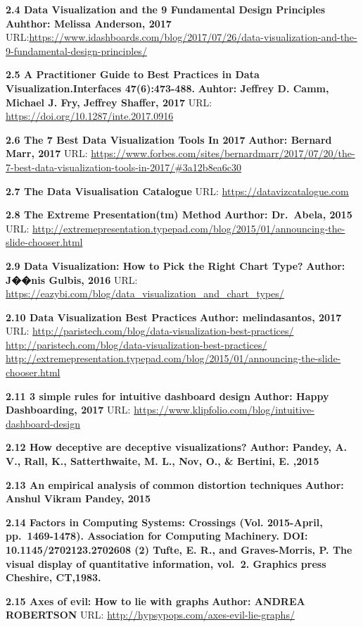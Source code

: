 \documentclass[]{book}
\theoremstyle{definition}
\theoremstyle{definition}
\theoremstyle{definition}
\theoremstyle{remark}
\begin{document}
\textbf{2.4 Data Visualization and the 9 Fundamental Design Principles}
\textbf{Auhthor: Melissa Anderson, 2017}
URL:\url{https://www.idashboards.com/blog/2017/07/26/data-visualization-and-the-9-fundamental-design-principles/}

\textbf{2.5 A Practitioner Guide to Best Practices in Data
Visualization.Interfaces 47(6):473-488.} \textbf{Auhtor: Jeffrey D.
Camm, Michael J. Fry, Jeffrey Shaffer, 2017 } URL:
\url{https://doi.org/10.1287/inte.2017.0916}

\textbf{2.6 The 7 Best Data Visualization Tools In 2017} \textbf{Author:
Bernard Marr, 2017} URL:
\url{https://www.forbes.com/sites/bernardmarr/2017/07/20/the-7-best-data-visualization-tools-in-2017/\#3a12b8ea6c30}

\textbf{2.7 The Data Visualisation Catalogue} URL:
\url{https://datavizcatalogue.com}

\textbf{2.8 The Extreme Presentation(tm) Method } \textbf{Aurthor:
Dr.~Abela, 2015 } URL:
\url{http://extremepresentation.typepad.com/blog/2015/01/announcing-the-slide-chooser.html}

\textbf{2.9 Data Visualization: How to Pick the Right Chart Type? }
\textbf{Author: J��nis Gulbis, 2016 } URL:
\url{https://eazybi.com/blog/data_visualization_and_chart_types/}

\textbf{2.10 Data Visualization Best Practices} \textbf{Author:
melindasantos, 2017} URL:
\url{http://paristech.com/blog/data-visualization-best-practices/}
\url{http://paristech.com/blog/data-visualization-best-practices/}
\url{http://extremepresentation.typepad.com/blog/2015/01/announcing-the-slide-chooser.html}

\textbf{2.11 3 simple rules for intuitive dashboard design}
\textbf{Author: Happy Dashboarding, 2017 } URL:
\url{https://www.klipfolio.com/blog/intuitive-dashboard-design}

\textbf{2.12 How deceptive are deceptive visualizations?}
\textbf{Author: Pandey, A. V., Rall, K., Satterthwaite, M. L., Nov, O.,
\& Bertini, E. ,2015 }

\textbf{2.13 An empirical analysis of common distortion techniques}
\textbf{Author: Anshul Vikram Pandey, 2015 }

\textbf{2.14 Factors in Computing Systems: Crossings (Vol. 2015-April,
pp.~1469-1478). Association for Computing Machinery. DOI:
10.1145/2702123.2702608 (2) Tufte, E. R., and Graves-Morris, P. The
visual display of quantitative information, vol.~2. Graphics press
Cheshire, CT,1983.}

\textbf{2.15 Axes of evil: How to lie with graphs} \textbf{Author:
ANDREA ROBERTSON} URL: \url{http://hypsypops.com/axes-evil-lie-graphs/}
\end{document}
